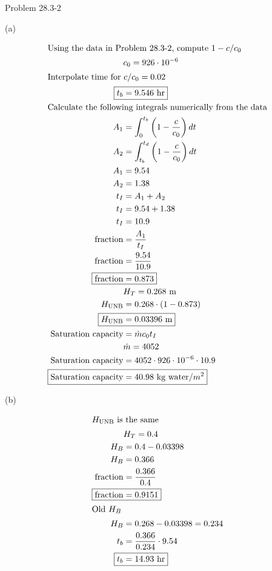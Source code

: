 \item Problem 28.3-2

(a)

\begin{align*}
    \intertext{Using the data in Problem 28.3-2, compute $1-c/c_0$}
    & c_0 = 926 \cdot 10^{-6} \\
    \intertext{Interpolate time for $c/c_0=0.02$}
    \Aboxed{t_b &= 9.546 \text{ hr}} \\
    \intertext{Calculate the following integrals numerically from the data}
    A_1 &= \int_0^{t_b} \left(1 - \frac{c}{c_0}\right) dt \\
    A_2 &= \int_{t_b}^{t_d} \left(1 - \frac{c}{c_0}\right) dt \\
    A_1 &= 9.54 \\
    A_2 &= 1.38 \\
    t_I &= A_1 + A_2 \\
    t_I &= 9.54 + 1.38 \\
    t_I &= 10.9 \\
    \text{fraction} &= \frac{A_1}{t_I} \\
    \text{fraction} &= \frac{9.54}{10.9} \\
    \Aboxed{\text{fraction} &= 0.873} \\
    & H_T = 0.268 \text{ m} \\
    H_{\text{UNB}} &= 0.268 \cdot \left(1 - 0.873\right) \\
    \Aboxed{H_{\text{UNB}} &= 0.03396 \text{ m}} \\
    \text{Saturation capacity} &= \dot m c_0 t_I \\
    & \dot m = 4052 \\
    \text{Saturation capacity} &= 4052 \cdot 926 \cdot 10^{-6} \cdot 10.9 \\
    \Aboxed{\text{Saturation capacity} &= 40.98 \text{ kg water/$m^2$}}
\end{align*}

\newpage
(b)

\begin{align*}
    \intertext{$H_{\text{UNB}}$ is the same}
    & H_T = 0.4 \\
    H_B &= 0.4 - 0.03398 \\
    H_B &= 0.366 \\
    \text{fraction} &= \frac{0.366}{0.4} \\
    \Aboxed{\text{fraction} &= 0.9151} \\
    \intertext{Old $H_B$}
    H_B &= 0.268 - 0.03398 = 0.234 \\
    t_b &= \frac{0.366}{0.234} \cdot 9.54 \\
    \Aboxed{t_b &= 14.93 \text{ hr}}
\end{align*}
